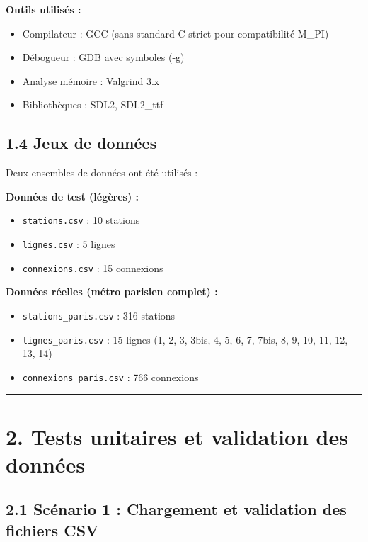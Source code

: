 \documentclass[
]{article}
\providecommand{\tightlist}{%
  \setlength{\itemsep}{0pt}\setlength{\parskip}{0pt}}
\begin{document}
\textbf{Outils utilisés :}

\begin{itemize}
\tightlist
\item
  Compilateur : GCC (sans standard C strict pour compatibilité M\_PI)
\item
  Débogueur : GDB avec symboles (-g)
\item
  Analyse mémoire : Valgrind 3.x
\item
  Bibliothèques : SDL2, SDL2\_ttf
\end{itemize}

\subsection{1.4 Jeux de données}\label{jeux-de-donnuxe9es}

Deux ensembles de données ont été utilisés :

\textbf{Données de test (légères) :}

\begin{itemize}
\tightlist
\item
  \texttt{stations.csv} : 10 stations
\item
  \texttt{lignes.csv} : 5 lignes
\item
  \texttt{connexions.csv} : 15 connexions
\end{itemize}

\textbf{Données réelles (métro parisien complet) :}

\begin{itemize}
\tightlist
\item
  \texttt{stations\_paris.csv} : 316 stations
\item
  \texttt{lignes\_paris.csv} : 15 lignes (1, 2, 3, 3bis, 4, 5, 6, 7,
  7bis, 8, 9, 10, 11, 12, 13, 14)
\item
  \texttt{connexions\_paris.csv} : 766 connexions
\end{itemize}

\begin{center}\rule{0.5\linewidth}{0.5pt}\end{center}

\section{2. Tests unitaires et validation des
données}\label{tests-unitaires-et-validation-des-donnuxe9es}

\subsection{2.1 Scénario 1 : Chargement et validation des fichiers
CSV}\label{scuxe9nario-1-chargement-et-validation-des-fichiers-csv}
\end{document}
